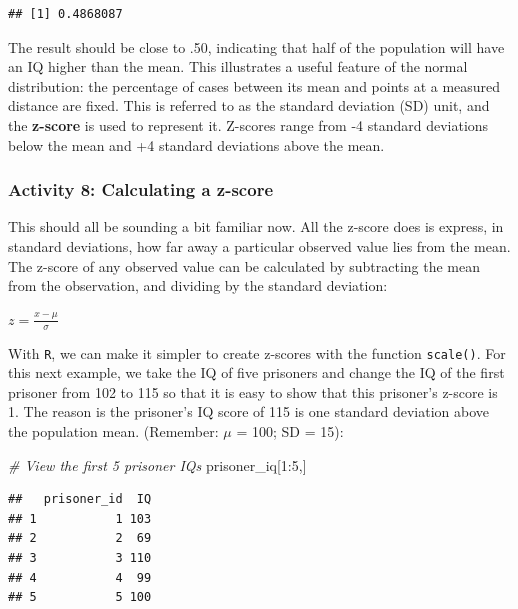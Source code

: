 \documentclass[
]{book}
\newenvironment{Shaded}{\begin{snugshade}}{\end{snugshade}}
\newcommand{\CommentTok}[1]{\textcolor[rgb]{0.56,0.35,0.01}{\textit{#1}}}
\newcommand{\DecValTok}[1]{\textcolor[rgb]{0.00,0.00,0.81}{#1}}
\newcommand{\NormalTok}[1]{#1}
\newcommand{\SpecialCharTok}[1]{\textcolor[rgb]{0.00,0.00,0.00}{#1}}
\begin{document}
\begin{verbatim}
## [1] 0.4868087
\end{verbatim}

The result should be close to .50, indicating that half of the population will have an IQ higher than the mean. This illustrates a useful feature of the normal distribution: the percentage of cases between its mean and points at a measured distance are fixed. This is referred to as the standard deviation (SD) unit, and the \textbf{z-score} is used to represent it. Z-scores range from -4 standard deviations below the mean and +4 standard deviations above the mean.

\hypertarget{activity-8-calculating-a-z-score}{%
\subsubsection{Activity 8: Calculating a z-score}\label{activity-8-calculating-a-z-score}}

This should all be sounding a bit familiar now. All the z-score does is express, in standard deviations, how far away a particular observed value lies from the mean. The z-score of any observed value can be calculated by subtracting the mean from the observation, and dividing by the standard deviation:

\(z = \frac{x - \mu}{\sigma}\)

With \texttt{R}, we can make it simpler to create z-scores with the function \texttt{scale()}. For this next example, we take the IQ of five prisoners and change the IQ of the first prisoner from 102 to 115 so that it is easy to show that this prisoner's z-score is 1. The reason is the prisoner's IQ score of 115 is one standard deviation above the population mean. (Remember: \(\mu\) = 100; SD = 15):

\begin{Shaded}
\begin{Highlighting}[]
\CommentTok{\# View the first 5 prisoner IQs}
\NormalTok{prisoner\_iq[}\DecValTok{1}\SpecialCharTok{:}\DecValTok{5}\NormalTok{,] }
\end{Highlighting}
\end{Shaded}

\begin{verbatim}
##   prisoner_id  IQ
## 1           1 103
## 2           2  69
## 3           3 110
## 4           4  99
## 5           5 100
\end{verbatim}
\end{document}

